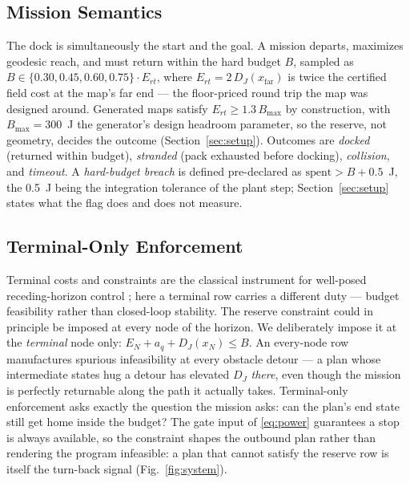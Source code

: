 \documentclass[preprint,12pt]{elsarticle}
\begin{document}
\subsection{Mission Semantics}
The dock is simultaneously the start and the goal. A mission departs,
maximizes geodesic reach, and must return within the hard budget
$B$, sampled as $B \in \{0.30, 0.45, 0.60, 0.75\}\cdot E_{rt}$,
where $E_{rt} = 2\,D_J(x_{\mathrm{far}})$ is twice the certified
field cost at the map's far end --- the floor-priced round trip the
map was designed around. Generated
maps satisfy $E_{rt} \ge 1.3\,B_{\max}$ by construction, with
$B_{\max} = 300$~J the generator's design headroom parameter, so the reserve, not geometry,
decides the outcome (Section~\ref{sec:setup}).
Outcomes are
\emph{docked} (returned within budget), \emph{stranded} (pack
exhausted before docking), \emph{collision}, and \emph{timeout}. A
\emph{hard-budget breach} is defined pre-declared as
$\text{spent} > B + 0.5$~J, the 0.5~J being the integration tolerance
of the plant step; Section~\ref{sec:setup} states what the flag does
and does not measure.

\subsection{Terminal-Only Enforcement}
Terminal costs and constraints are the classical instrument for
well-posed receding-horizon control \cite{mayne2000constrained,
chen1998quasi}; here a terminal row carries a different duty ---
budget feasibility rather than closed-loop stability. The reserve
constraint could in principle be imposed at every node of
the horizon. We deliberately impose it at the \emph{terminal} node
only: $E_N + a_q + D_J(x_N) \le B$. An every-node row manufactures
spurious infeasibility at every obstacle detour --- a plan whose
intermediate states hug a detour has elevated $D_J$ \emph{there},
even though the mission is perfectly returnable along the path it
actually takes. Terminal-only enforcement asks exactly the question
the mission asks: can the plan's end state still get home inside the
budget? The gate input of \eqref{eq:power} guarantees a stop is always
available, so the constraint shapes the outbound plan rather than
rendering the program infeasible: a plan that cannot satisfy the
reserve row is itself the turn-back signal
(Fig.~\ref{fig:system}).
\end{document}
